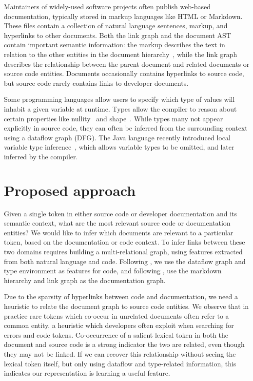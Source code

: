\documentclass{article}
\begin{document}
Maintainers of widely-used software projects often publish web-based documentation, typically stored in markup languages like HTML or Markdown. These files contain a collection of natural language sentences, markup, and hyperlinks to other documents. Both the link graph and the document AST contain important semantic information: the markup describes the text in relation to the other entities in the document hierarchy~\citep{yang2016hierarchical}, while the link graph describes the relationship between the parent document and related documents or source code entities. Documents occasionally contains hyperlinks to source code, but source code rarely contains links to developer documents.

Some programming languages allow users to specify which type of values will inhabit a given variable at runtime. Types allow the compiler to reason about certain properties like nullity~\citep{ekman2007pluggable} and shape~\citep{considine2019kotlingrad}. While types many not appear explicitly in source code, they can often be inferred from the surrounding context using a dataflow graph (DFG). The Java language recently introduced local variable type inference~\citet{liddell2019analyzing}, which allows variable types to be omitted, and later inferred by the compiler.

\section{Proposed approach}

Given a single token in either source code or developer documentation and its semantic context, what are the most relevant source code or documentation entities? We would like to infer which documents are relevant to a particular token, based on the documentation or code context. To infer links between these two domains requires building a multi-relational graph, using features extracted from both natural language and code. Following \citet{si2018learning, gu2018deep, 10.1145/3361242.3362774}, we use the dataflow graph and type environment as features for code, and following \citet{yang2016hierarchical, zhang2018link}, use the markdown hierarchy and link graph as the documentation graph.

Due to the sparsity of hyperlinks between code and documentation, we need a heuristic to relate the document graph to source code entities. We observe that in practice rare tokens which co-occur in unrelated documents often refer to a common entity, a heuristic which developers often exploit when searching for errors and code tokens. Co-occurrence of a salient lexical token in both the document and source code is a strong indicator the two are related, even though they may not be linked. If we can recover this relationship without seeing the lexical token itself, but only using dataflow and type-related information, this indicates our representation is learning a useful feature.
\end{document}
